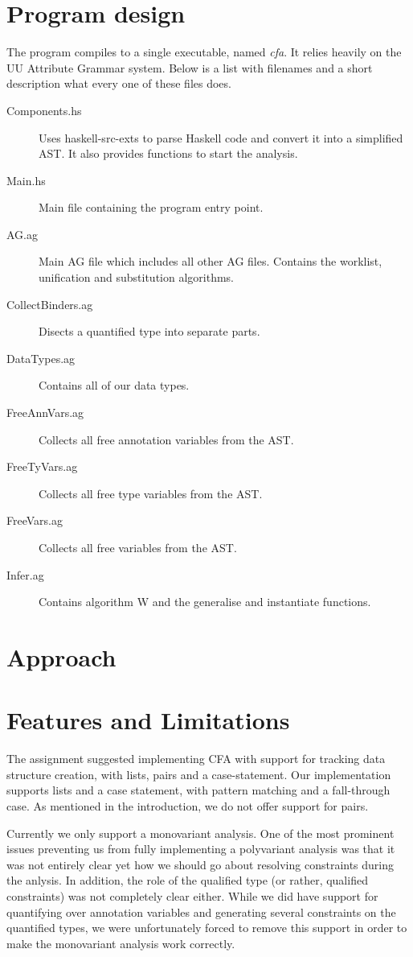 \documentclass[a4paper]{article}
\begin{document}
\section{Program design}
The program compiles to a single executable, named \emph{cfa}. It relies heavily
on the UU Attribute Grammar system. Below is a list with filenames and a short
description what every one of these files does.

\begin{description}
\item [Components.hs] Uses haskell-src-exts to parse Haskell code and convert
it into a simplified AST. It also provides functions to start the analysis.
\item [Main.hs] Main file containing the program entry point.
\item [AG.ag] Main AG file which includes all other AG files. Contains the worklist,
unification and substitution algorithms.
\item [CollectBinders.ag] Disects a quantified type into separate parts.
\item [DataTypes.ag] Contains all of our data types.
\item [FreeAnnVars.ag] Collects all free annotation variables from the AST.
\item [FreeTyVars.ag] Collects all free type variables from the AST.
\item [FreeVars.ag] Collects all free variables from the AST.
\item [Infer.ag] Contains algorithm W and the generalise and instantiate functions.
\end{description}

\section{Approach}


\section{Features and Limitations}

The assignment suggested implementing CFA with support for tracking data structure
creation, with lists, pairs and a case-statement. Our implementation supports lists and 
a case statement, with pattern matching and a fall-through case. As mentioned in
the introduction, we do not offer support for pairs.

Currently we only support a monovariant analysis. One of the most prominent issues
preventing us from fully implementing a polyvariant analysis was that it was not
entirely clear yet how we should go about resolving constraints during the anlysis.
In addition, the role of the qualified type (or rather, qualified constraints)
was not completely clear either. While we did have support for quantifying over
annotation variables and generating several constraints on the quantified types,
we were unfortunately forced to remove this support in order to make the monovariant
analysis work correctly.
\end{document}
